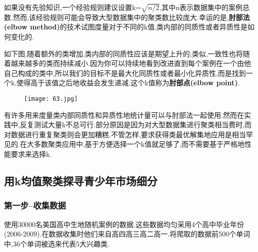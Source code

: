 \documentclass[11pt,a4paper,oneside]{book}
\begin{document}
如果没有先验知识,一个经验规则建议设置k=$ \sqrt{n/2} $,其中n表示数据集中的案例总数.然而,该经验规则可能会导致大型数据集中的聚类数比较庞大.幸运的是,\textbf{肘部法(elbow method)}的技术试图度量对于不同的k值,类内部的同质性或者异质性是如何变化的.

如下图,随着额外的类增加,类内部的同质性应该是期望上升的;类似,一致性也将随着越来越多的类而持续减小.因为你可以持续地看到改进直到每个案例在一个由他自己构成的类中,所以我们的目标不是最大化同质性或者最小化异质性,而是找到一个k,使得高于该值之后地收益会发生递减.这个k值称为\textbf{肘部点(elbow point)}.

\begin{figure}[H]
	\centering
	\texttt{[image: 63.jpg]}
\end{figure}

有许多用来度量类内部同质性和异质性地统计量可以与肘部法一起使用.然而在实践中,反复测试大量k不总可行.部分原因是因为对大型数据集进行聚类相当费时,而对数据进行重复聚类则会更加糟糕.不管怎样,要求获得类最优解集地应用是相当罕见的.在大多数聚类应用中,基于方便选择一个k值就足够了,而不需要基于严格地性能要求来选择k.

\subsection{用k均值聚类探寻青少年市场细分}
\subsubsection{第一步--收集数据}
使用30000名美国高中生地随机案例的数据.这些数据均匀采用4个高中毕业年份(2006-2009).在数据收集时他们来自高四高三高二高一.将爬取的数据前500个单词中,36个单词被选来代表5大兴趣类.
\end{document}
